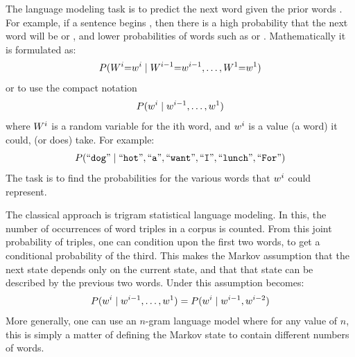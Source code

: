 \documentclass[parskip]{komatufte}
\begin{document}
The language modeling task is to predict the next word given the prior words .
For example, if a sentence begins , then there is a high probability that the next word will be  or ,
and lower probabilities of words such as  or .
Mathematically it is formulated as: 
\begin{equation}\label{equ:langmodel}
	P(\n W_i{=}\n w_i \mid \n W_{i-1}{=}\n w_{i-1}, \ldots, \n W_1{=}\n w_1)
\end{equation}
or to use the compact notation 
\begin{equation}\label{equ:langmodelcompact}
P(\n w_i \mid \n w_{i-1}, \ldots, \n w_1)
\end{equation}
where $\n W_i$ is a random variable for the ith word, and $\n w_i$ is a value (a word) it could, (or does) take.
For example: 
\begin{equation*}
P(\natlang{dog} \mid \natlang{hot}, \natlang{a}, \natlang{want}, \natlang{I}, \natlang{lunch}, \natlang{For})
\end{equation*}
The task is to find the probabilities for the various words that $\n w_i$ could represent.


  
The classical approach is trigram statistical language modeling.
In this, the number of occurrences of word triples in a corpus is counted.
From this joint probability of triples, one can condition upon the first two words,
to get a conditional probability of the third.
This makes the Markov assumption that the next state depends only on the current state,
and that that state can be described by the previous two words.
Under this assumption  becomes:
\begin{equation}\label{equ:trigramlangmodel}
P(\n w_i \mid \n w_{i-1}, \ldots, \n w_1) = P(\n w_i \mid \n w_{i-1}, \n w_{i-2})
\end{equation}
More generally, one can use an $n$-gram language model where for any value of $n$,
this is simply a matter of defining the Markov state to contain different numbers of words.
\end{document}
